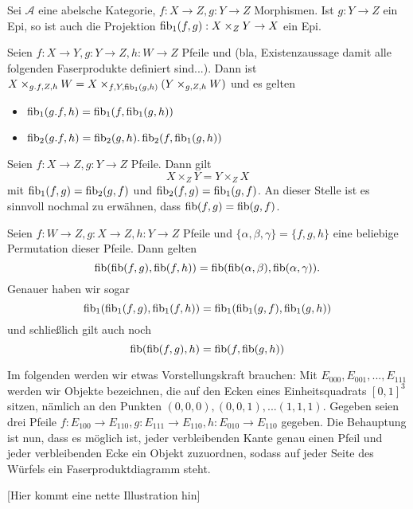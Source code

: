\begin{prop} Sei $\mathcal A$ eine abelsche Kategorie, $f : X \to Z, g : Y\to Z$ Morphismen. Ist $g: Y\to Z$ ein Epi, so ist auch die Projektion $\operatorname{fib}_1(f,g): X\times_Z Y \to X$ ein Epi.
\end{prop}

\begin{satz}[Staffelung]
Seien $f: X\to Y,g : Y\to Z,h:W\to Z$ Pfeile und (bla, Existenzaussage damit alle folgenden Faserprodukte definiert sind...). Dann ist $X\times_{g.f,Z,h} W = X\times_{f,Y,\operatorname{fib}_1(g,h)} (Y\times_{g,Z,h} W)$ und es gelten
\begin{itemize}
\item $\operatorname{fib}_1(g.f,h) = \operatorname{fib}_1(f,\operatorname{fib}_1(g,h))$
\item $\operatorname{fib}_2(g.f,h) = \operatorname{fib}_2(g,h) . \operatorname{fib}_2(f,\operatorname{fib}_1(g,h))$
\end{itemize}
\end{satz}

\begin{prop}[Kommutativität]
Seien $f : X\to Z, g:Y\to Z$ Pfeile. Dann gilt
\[ X\times_Z Y = Y\times_Z X \]
mit $\operatorname{fib}_1(f,g) = \operatorname{fib}_2(g,f)$ und $\operatorname{fib}_2(f,g) = \operatorname{fib}_1(g,f)$.
An dieser Stelle ist es sinnvoll nochmal zu erwähnen, dass $\operatorname{fib}(f,g) = \operatorname{fib}(g,f)$.
\end{prop}

\begin{prop}[Assoziativität]
Seien $f : W \to Z, g: X \to Z, h : Y\to Z$ Pfeile und $\{ \alpha, \beta, \gamma \} = \{ f,g,h\}$ eine beliebige Permutation dieser Pfeile. Dann gelten
\[ \operatorname{fib}(\operatorname{fib}(f,g),\operatorname{fib}(f,h)) = \operatorname{fib}(\operatorname{fib}(\alpha,\beta),\operatorname{fib}(\alpha,\gamma)). \]
Genauer haben wir sogar
\[ \operatorname{fib}_1(\operatorname{fib}_1(f,g),\operatorname{fib}_1(f,h)) = \operatorname{fib}_1(\operatorname{fib}_1(g,f),\operatorname{fib}_1(g,h)) \]
und schließlich gilt auch noch
\[ \operatorname{fib}(\operatorname{fib}(f,g),h) = \operatorname{fib}(f,\operatorname{fib}(g,h)) \]
\end{prop}

\begin{korr}[Faserproduktwürfel]
Im folgenden werden wir etwas Vorstellungskraft brauchen: Mit $E_{000},E_{001},...,E_{111}$ werden wir Objekte bezeichnen, die auf den Ecken eines Einheitsquadrats $[0,1]^3$ sitzen, nämlich an den Punkten $(0,0,0),(0,0,1),...(1,1,1)$.
Gegeben seien drei Pfeile $f : E_{100} \to E_{110}, g : E_{111} \to E_{110}, h : E_{010} \to E_{110}$ gegeben. Die Behauptung ist nun, dass es möglich ist, jeder verbleibenden Kante genau einen Pfeil und jeder verbleibenden Ecke ein Objekt zuzuordnen, sodass auf jeder Seite des Würfels ein Faserproduktdiagramm steht.

[Hier kommt eine nette Illustration hin]
\end{korr}

